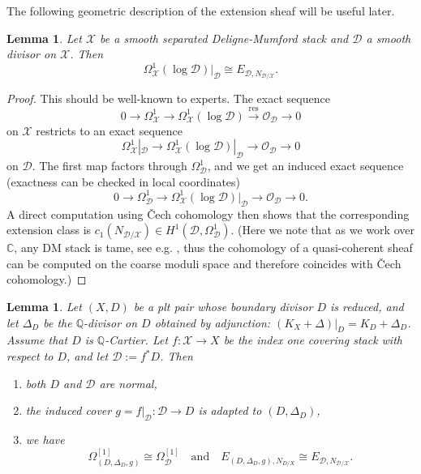 \documentclass[12pt]{amsart}
\newtheorem{lem}[prop]{Lemma}
\theoremstyle{definition}
\newcommand{\bC}{\mathbb{C}}
\newcommand{\bQ}{\mathbb{Q}}
\newcommand{\cX}{\mathcal{X}}
\newcommand{\cO}{\mathcal{O}}
\newcommand{\cE}{\mathcal{E}}
\newcommand{\cD}{\mathcal{D}}
\numberwithin{equation}{section}
\begin{document}
The following geometric description of the extension sheaf will be useful later.

\begin{lem} \label{lem:log cotangent restrict to can ext}
Let $\cX$ be a smooth separated Deligne-Mumford stack and $\cD$ a smooth divisor on $\cX$. Then
\[
\Omega_{\cX}^1(\log \cD)|_{\cD} \cong E_{\cD,N_{\cD/\cX}}.
\]
\end{lem}

\begin{proof}
This should be well-known to experts. The exact sequence 
\[
0\to \Omega^1_{\cX}\to \Omega^1_{\cX}(\log \cD)\xrightarrow{\mathrm{res}}\cO_{\cD}\to 0
\]
on $\cX$ restricts to an exact sequence
\[
\Omega_{\cX}^1|_{\cD}\to \Omega^1_{\cX}(\log \cD)|_{\cD}\to \cO_{\cD}\to 0
\]
on $\cD$. The first map factors through $\Omega_{\cD}^1$, and we get an induced exact sequence (exactness can be checked in local coordinates)
\[
0\to \Omega_{\cD}^1\to \Omega^1_{\cX}(\log \cD)|_{\cD}\to \cO_{\cD}\to 0.
\]
A direct computation using \v{C}ech cohomology then shows that the corresponding extension class is $c_1(N_{{\cD}/\cX})\in H^1(\cD,\Omega_{\cD}^1)$. (Here we note that as we work over $\bC$, any DM stack is tame, see e.g. \cite[Section 3]{AOV-tame-stack}, thus the cohomology of a quasi-coherent sheaf can be computed on the coarse moduli space and therefore coincides with \v{C}ech cohomology.) 
\end{proof}

\begin{lem} \label{lem:orbifold cotangent}
Let $(X,D)$ be a plt pair whose boundary divisor $D$ is reduced, and let $\Delta_D$ be the $\bQ$-divisor on $D$ obtained by adjunction: $(K_X+\Delta)|_D=K_D+\Delta_D$. Assume that $D$ is $\bQ$-Cartier. Let $f\colon \cX\to X$ be the index one covering stack with respect to $D$, and let $\cD:=f^*D$. Then %
\begin{enumerate}
    \item both $D$ and $\cD$ are normal,
    \item the induced cover $g=f|_{\cD}\colon \cD\to D$ is adapted to $(D,\Delta_D)$, 
    \item we have 
    \[
    \Omega^{[1]}_{(D,\Delta_D,g)} \cong \Omega^{[1]}_{\cD} \quad \mathrm{and} \quad E_{(D,\Delta_D,g),N_{D/X}}\cong E_{\cD,N_{\cD/\cX}}.
    \] 
\end{enumerate}
\end{lem}
\end{document}
